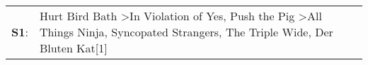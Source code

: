 \begin{supertabular}{p{0.03\textwidth}p{0.92\textwidth}}
 \textbf{S1}:  &  Hurt Bird Bath\textsuperscript{} \textgreater \enspace In Violation of Yes\textsuperscript{}, \enspace Push the Pig\textsuperscript{} \textgreater \enspace All Things Ninja\textsuperscript{}, \enspace Syncopated Strangers\textsuperscript{}, \enspace The Triple Wide\textsuperscript{}, \enspace Der Bluten Kat[1]\textsuperscript{}  \enspace  \\
\end{supertabular}
